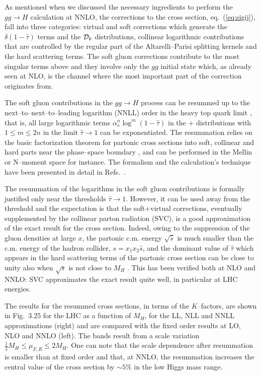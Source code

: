 As mentioned when we discussed the necessary ingredients to perform the $gg \to
H$ calculation at NNLO, the corrections to the cross section,
eq.~(\ref{eq:sigij}), fall into three categories: virtual and soft corrections
which generate the $\delta (1- \hat \tau)$ terms and the ${\cal D}_k$
distributions, collinear logarithmic contributions that are controlled by the
regular part of the Altarelli--Parisi splitting kernels and the hard scattering
terms.  The soft gluon corrections contribute to the most singular terms above
and they involve only the $gg$ initial state which, as already seen at NLO, is
the channel where the most important part of the correction originates from.\s

The soft gluon contributions in the $gg \to H$ process can be resummed up to
the next--to--next--to--leading logarithm (NNLL) order in the heavy top quark
limit \cite{ggH-NNLO-resum}, that is, all large logarithmic terms $\alpha_s^n
\log^m (1 - \hat \tau)$ in the $+$ distributions with $1 \leq m \leq 2n$ in the
limit $\hat \tau \to 1$ can be exponentiated. The resummation relies on the
basic factorization theorem for partonic cross sections into soft, collinear
and hard parts near the phase--space boundary \cite{Collins}, and can be
performed in the Mellin or N--moment space \cite{Sterman+Catani+Luca} for
instance. The formalism and the calculation's technique have been presented in
detail in Refs.~\cite{ggH-NNLO-resum,ggH-Laenen}. \s

The resummation of the logarithms in the soft gluon contributions is formally
justified only near the thresholds $\hat \tau \to 1$. However, it can be used
away from the threshold and the expectation is that the soft+virtual
corrections, eventually supplemented by the collinear parton radiation (SVC), is
a good approximation of the exact result for the cross section. Indeed, owing
to the suppression of the gluon densities at large $x$, the partonic c.m. energy
$\sqrt{\hat{s}}$ is much smaller than the c.m. energy of the hadron collider,
$s=x_1x_2\hat{s}$, and the dominant value of $\hat \tau$ which appears in the
hard scattering terms of the partonic cross section can be close to unity also
when $\sqrt s$ is not close to $M_H$ \cite{ggH-SVC,ggH-HSVC}. This has been 
verified both at NLO and NNLO:  SVC approximates the exact result quite well, 
in particular at LHC energies.  \s

The results for the resummed cross sections, in terms of the $K$--factors,
are shown in Fig.~3.25 for the LHC as a function of $M_H$, for the LL,
NLL and NNLL approximations (right) and are compared with the fixed order 
results at LO, NLO and NNLO (left). The bands result from a scale variation 
$\frac12 M_H \leq \mu_{F,R} \leq 2M_H$. One can note that the scale dependence  
after resummation is smaller than at fixed order and that, at NNLO, the 
resummation increases the central value of the cross section by $\sim 5\%$ 
in the low Higgs mass range. 


